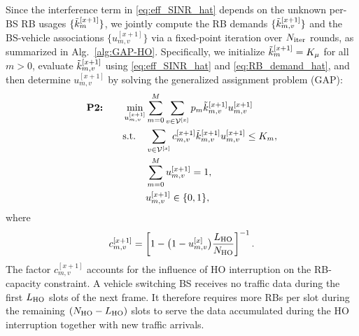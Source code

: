 \documentclass[10pt,journal,letterpaper]{IEEEtran}
\newcommand{\rev}[1]{\textcolor{revisioncolor}{{}#1}}
\theoremstyle{remark}
\begin{document}
Since the interference term in \eqref{eq:eff_SINR_hat} depends on the unknown per-BS RB usages $\{\Tilde{k}_{m}^{[x+1]}\}$, we jointly compute the RB demands $\{\Tilde{k}_{m,v}^{[x+1]}\}$ and the BS-vehicle associations $\{u_{m,v}^{[x+1]}\}$ via a fixed-point iteration \rev{over $N_{\rm iter}$ rounds}, as summarized in Alg.~\ref{alg:GAP-HO}. Specifically, we initialize $\Tilde{k}_{m}^{[x+1]}=K_\mu$ for all $m>0$, evaluate $\Tilde{k}_{m,v}^{[x+1]}$ using \eqref{eq:eff_SINR_hat} and \eqref{eq:RB_demand_hat}, and then determine $u_{m,v}^{[x+1]}$ by solving the generalized assignment problem (GAP):
\begin{align}
    \label{prob2}
    \textbf{P2:} \qquad  \min_{u_{m,v}^{[x+1]}} & \sum_{m=0}^M \sum_{v\in\mathcal{V}^{[x]}} p_m  \Tilde{k}_{m,v}^{[x+1]} u_{m,v}^{[x+1]} \\
    \textup{s.t.} \quad 
    & \sum_{v \in \mathcal{V}^{[x]}} \rev{c_{m,v}^{[x+1]}}\Tilde{k}_{m,v}^{[x+1]} u_{m,v}^{[x+1]} \leq K_m,
    \label{prob2:subcarrier cons}\\
    & \sum_{m=0}^{M} u_{m,v}^{[x+1]} = 1,
    \label{prob2:connection cons} \\
    & u_{m,v}^{[x+1]} \in \{0,1\},
    \label{prob2:u cons} 
\end{align}
where
\begin{equation}
    \rev{c_{m,v}^{[x+1]}=
    \left[1-\bigl(1-u_{m,v}^{[x]}\bigr)
    \frac{L_{\rm HO}}{N_{\rm HO}}\right]^{-1}.}
    \label{eq:HO_capacity_factor}
\end{equation}
\rev{The factor $c_{m,v}^{[x+1]}$ accounts for the influence of HO interruption on the RB-capacity constraint. A vehicle switching BS receives no traffic data during the first $L_{\rm HO}$ slots of the next frame. It therefore requires more RBs per slot during the remaining $(N_{\rm HO}-L_{\rm HO})$ slots to serve the data accumulated during the HO interruption together with new traffic arrivals.}
\end{document}
